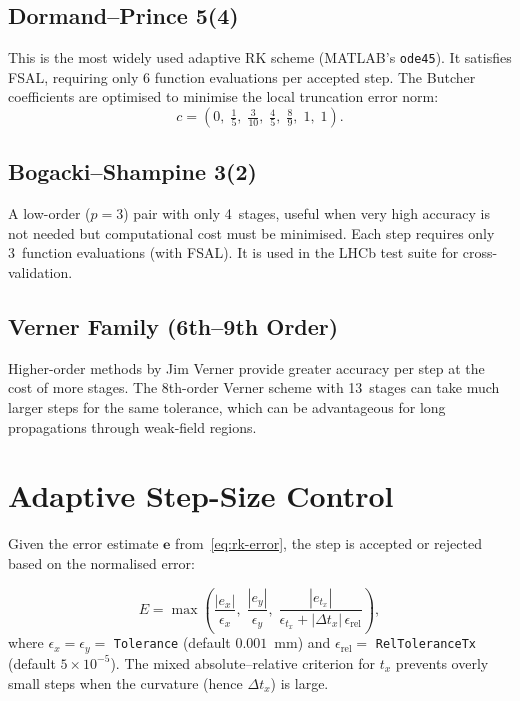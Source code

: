 \documentclass[11pt,a4paper]{article}
\newcommand{\bvec}[1]{\mathbf{#1}}
\begin{document}
\subsection{Dormand--Prince 5(4)}

This is the most widely used adaptive RK scheme (MATLAB's \texttt{ode45}).
It satisfies FSAL, requiring only 6 function evaluations per accepted step.
The Butcher coefficients are optimised to minimise the local truncation error
norm:
\[
  c = \left(0,\;\tfrac{1}{5},\;\tfrac{3}{10},\;\tfrac{4}{5},\;\tfrac{8}{9},\;1,\;1\right).
\]

\subsection{Bogacki--Shampine 3(2)}

A low-order ($p=3$) pair with only 4~stages, useful when very high accuracy is
not needed but computational cost must be minimised. Each step requires only
3~function evaluations (with FSAL). It is used in the LHCb test suite for
cross-validation.

\subsection{Verner Family (6th--9th Order)}

Higher-order methods by Jim Verner provide greater accuracy per step at
the cost of more stages. The 8th-order Verner scheme with 13~stages can
take much larger steps for the same tolerance, which can be advantageous
for long propagations through weak-field regions.


\section{Adaptive Step-Size Control}\label{sec:stepsize}

Given the error estimate $\bvec{e}$ from~\eqref{eq:rk-error}, the step is
accepted or rejected based on the normalised error:

\begin{equation}
  E = \max\!\left(
    \frac{|e_x|}{\epsilon_x},\;
    \frac{|e_y|}{\epsilon_y},\;
    \frac{|e_{t_x}|}{\epsilon_{t_x} + |\Delta t_x|\,\epsilon_\text{rel}}
  \right),
\end{equation}
where $\epsilon_x = \epsilon_y = $ \texttt{Tolerance} (default $0.001$~mm)
and $\epsilon_\text{rel} = $ \texttt{RelToleranceTx} (default $5\times10^{-5}$).
The mixed absolute--relative criterion for $t_x$ prevents overly small steps
when the curvature (hence $\Delta t_x$) is large.
\end{document}
